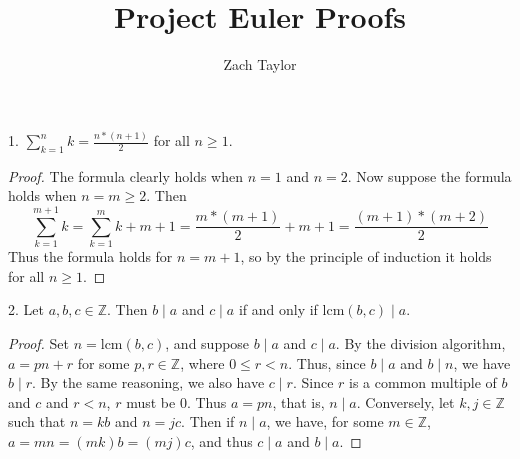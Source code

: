 \documentclass[12pt]{article}
\newcommand{\Z}{\mathbb{Z}}
\begin{document}
\title{Project Euler Proofs}
\author{Zach Taylor}
\maketitle

1. $\sum_{k=1}^n{k} = \frac{n*(n+1)}{2}$ for all $n \geq 1$.
\begin{proof}
  The formula clearly holds when $n=1$ and $n=2$. Now suppose the formula holds 
  when $n = m \geq 2$. Then 
  $$\sum_{k=1}^{m+1}{k} = \sum_{k=1}^m{k} + m + 1 = \frac{m*(m+1)}{2} + m + 1
  = \frac{(m+1)*(m+2)}{2}$$
  Thus the formula holds for $n = m + 1$, so by the principle of induction it holds 
  for all $n \geq 1$.
\end{proof}
\bigbreak

2. Let $a, b, c \in \Z$. Then $b \mid a$ and $c \mid a$ if and only if 
$\text{lcm}(b, c) \mid a$.
\begin{proof}
  Set $n = \text{lcm}(b, c)$, and suppose $b \mid a$ and $c \mid a$. By the 
  division algorithm, $a = pn + r$ for some $p,r \in \Z$, where $0 \leq r < n$. 
  Thus, since $b \mid a$ and $b \mid n$, we have $b \mid r$. By the same reasoning, we
  also have $c \mid r$. Since $r$ is a common multiple of $b$ and $c$ and $r < n$,
  $r$ must be $0$. Thus $a = pn$, that is, $n \mid a$.
  Conversely, let $k, j \in \Z$ such that $n = kb$ and $n = jc$. Then if
  $n \mid a$, we have, for some $m \in \Z$, $a = mn = (mk)b = (mj)c$, and thus
  $c \mid a$ and $b \mid a$.
\end{proof}
\end{document}
